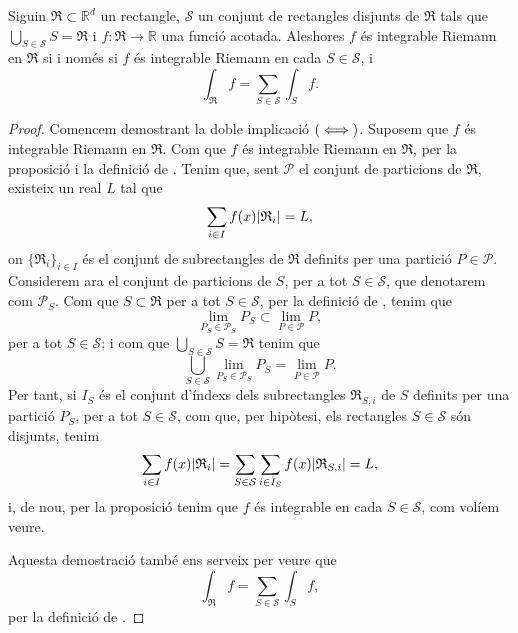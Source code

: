 \documentclass[../Apunts.tex]{subfiles}
\begin{document}
	\begin{theorem}
		Siguin \({{\mathfrak{R}}}\subset\mathbb{R}^{d}\) un rectangle, \(\mathcal{S}\) un conjunt de rectangles disjunts de \(\mathfrak{R}\) tals que \(\bigcup_{S\in\mathcal{S}}S=\mathfrak{R}\) i \(f\colon\mathfrak{R}\to\mathbb{R}\) una funció acotada. Aleshores \(f\) és integrable Riemann en \(\mathfrak{R}\) si i només si \(f\) és integrable Riemann en cada \(S\in\mathcal{S}\), i
		\[\int_{\mathfrak{R}}f=\sum_{S\in\mathcal{S}}\int_{S}f.\]
		\begin{proof}
			Comencem demostrant la doble implicació \((\iff)\). Suposem que \(f\) és integrable Riemann en \(\mathfrak{R}\). Com que \(f\) és integrable Riemann en \(\mathfrak{R}\), per la proposició  i la definició de . Tenim que, sent \(\mathcal{P}\) el conjunt de particions de \(\mathfrak{R}\), existeix un real \(L\) tal que
			\[\sum_{i\in I}f(x)\abs{\mathfrak{R}_{i}}=L,\]
			on \(\{\mathfrak{R}_{i}\}_{i\in I}\) és el conjunt de subrectangles de \(\mathfrak{R}\) definits per una partició \(P\in\mathcal{P}\). Considerem ara el conjunt de particions de \(S\), per a tot \(S\in\mathcal{S}\), que denotarem com \(\mathcal{P}_{S}\). Com que \(S\subset\mathfrak{R}\) per a tot \(S\in\mathcal{S}\), per la definició de , tenim que
			\[\lim_{P_{S}\in\mathcal{P}_{S}}P_{S}\subset\lim_{P\in\mathcal{P}}P,\]
			per a tot \(S\in\mathcal{S}\); i com que \(\bigcup_{S\in\mathcal{S}}S=\mathfrak{R}\) tenim que
			\[\bigcup_{S\in\mathcal{S}}\lim_{P_{S}\in\mathcal{P}_{S}}P_{S}=\lim_{P\in\mathcal{P}}P.\]
			Per tant, si \(I_{S}\) és el conjunt d'índexs dels subrectangles \(\mathfrak{R}_{S,i}\) de \(S\) definits per una partició \(P_{S}\), per a tot \(S\in\mathcal{S}\), com que, per hipòtesi, els rectangles \(S\in\mathcal{S}\) són disjunts, tenim
			\[\sum_{i\in I}f(x)\abs{\mathfrak{R}_{i}}=\sum_{S\in\mathcal{S}}\sum_{i\in I_{S}}f(x)\abs{\mathfrak{R}_{S,i}}=L,\]
			i, de nou, per la proposició  tenim que \(f\) és integrable en cada \(S\in\mathcal{S}\), com volíem veure.
			
			Aquesta demostració també ens serveix per veure que
			\[\int_{\mathfrak{R}}f=\sum_{S\in\mathcal{S}}\int_{S}f,\]
			per la definició de . %
		\end{proof}
	\end{theorem}
\end{document}
